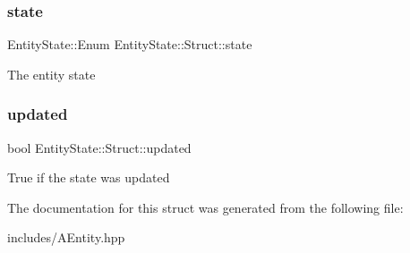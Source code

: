 \subsubsection{\texorpdfstring{state}{state}}
{\footnotesize\ttfamily Entity\+State\+::\+Enum Entity\+State\+::\+Struct\+::state}

The entity state \mbox{\label{struct_entity_state_1_1_struct_ab388472336f3bc953d83554990003c0e}} 
\subsubsection{\texorpdfstring{updated}{updated}}
{\footnotesize\ttfamily bool Entity\+State\+::\+Struct\+::updated}

True if the state was updated 

The documentation for this struct was generated from the following file\+:\begin{DoxyCompactItemize}
\item 
includes/A\+Entity.\+hpp\end{DoxyCompactItemize}
